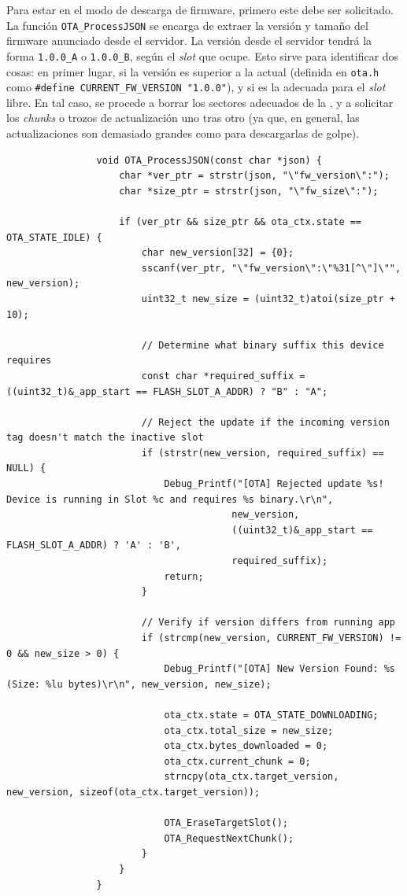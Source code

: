 \documentclass[../main.tex]{subfiles}
\begin{document}
            Para estar en el modo de descarga de firmware, primero este debe ser solicitado. La función \texttt{OTA\_ProcessJSON} se encarga de extraer la versión y tamaño del firmware anunciado desde el servidor. La versión desde el servidor tendrá la forma \texttt{1.0.0\_A} o \texttt{1.0.0\_B}, según el \emph{slot} que ocupe. Esto sirve para identificar dos cosas: en primer lugar, si la versión es superior a la actual (definida en \texttt{ota.h} como \lstinline|#define CURRENT_FW_VERSION "1.0.0"|), y si es la adecuada para el \emph{slot} libre. En tal caso, se procede a borrar los sectores adecuados de la , y a solicitar los \emph{chunks} o trozos de actualización uno tras otro (ya que, en general, las actualizaciones son demasiado grandes como para descargarlas de golpe).

            \begin{lstlisting}
                void OTA_ProcessJSON(const char *json) {
                    char *ver_ptr = strstr(json, "\"fw_version\":");
                    char *size_ptr = strstr(json, "\"fw_size\":");

                    if (ver_ptr && size_ptr && ota_ctx.state == OTA_STATE_IDLE) {
                        char new_version[32] = {0};
                        sscanf(ver_ptr, "\"fw_version\":\"%31[^\"]\"", new_version);
                        uint32_t new_size = (uint32_t)atoi(size_ptr + 10);

                        // Determine what binary suffix this device requires
                        const char *required_suffix = ((uint32_t)&_app_start == FLASH_SLOT_A_ADDR) ? "B" : "A";

                        // Reject the update if the incoming version tag doesn't match the inactive slot
                        if (strstr(new_version, required_suffix) == NULL) {
                            Debug_Printf("[OTA] Rejected update %s! Device is running in Slot %c and requires %s binary.\r\n",
                                        new_version,
                                        ((uint32_t)&_app_start == FLASH_SLOT_A_ADDR) ? 'A' : 'B',
                                        required_suffix);
                            return;
                        }

                        // Verify if version differs from running app
                        if (strcmp(new_version, CURRENT_FW_VERSION) != 0 && new_size > 0) {
                            Debug_Printf("[OTA] New Version Found: %s (Size: %lu bytes)\r\n", new_version, new_size);

                            ota_ctx.state = OTA_STATE_DOWNLOADING;
                            ota_ctx.total_size = new_size;
                            ota_ctx.bytes_downloaded = 0;
                            ota_ctx.current_chunk = 0;
                            strncpy(ota_ctx.target_version, new_version, sizeof(ota_ctx.target_version));

                            OTA_EraseTargetSlot();
                            OTA_RequestNextChunk();
                        }
                    }
                }
            \end{lstlisting}
\end{document}
